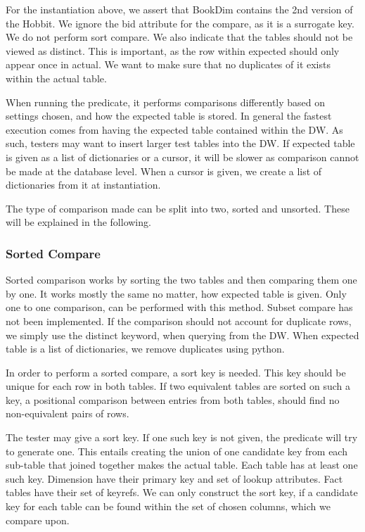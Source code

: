 For the instantiation above, we assert that BookDim contains the 2nd version of the Hobbit. We ignore the bid attribute for the compare, as it is a surrogate key. We do not perform sort compare. We also indicate that the tables should not be viewed as distinct. This is important, as the row within expected should only appear once in actual. We want to make sure that no duplicates of it exists within the actual table.

When running the predicate, it performs comparisons differently based on settings chosen, and how the expected table is stored. In general the fastest execution comes from having the expected table contained within the DW. As such, testers may want to insert larger test tables into the DW. If expected table is given as a list of dictionaries or a cursor, it will be slower as comparison cannot be made at the database level. When a cursor is given, we create a list of dictionaries from it at instantiation.

The type of comparison made can be split into two, sorted and unsorted. These will be explained in the following.

\subsubsection{Sorted Compare}
Sorted comparison works by sorting the two tables and then comparing them one by one. It works mostly the same no matter, how expected table is given. Only one to one comparison, can be performed with this method. Subset compare has not been implemented. If the comparison should not account for duplicate rows, we simply use the distinct keyword, when querying from the DW. When expected table is a list of dictionaries, we remove duplicates using python. 

In order to perform a sorted compare, a sort key is needed. This key should be unique for each row in both tables. If two equivalent tables are sorted on such a key, a positional comparison between entries from both tables, should find no non-equivalent pairs of rows. 

The tester may give a sort key. If one such key is not given, the predicate will try to generate one. This entails creating the union of one candidate key from each sub-table that joined together makes the actual table. Each table has at least one such key. Dimension have their primary key and set of lookup attributes. Fact tables have their set of keyrefs. We can only construct the sort key, if a candidate key for each table can be found within the set of chosen columns, which we compare upon. 

